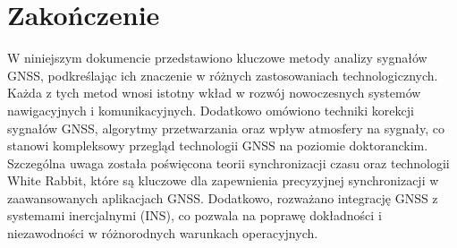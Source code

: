\section{Zakończenie}
W niniejszym dokumencie przedstawiono kluczowe metody analizy sygnałów GNSS, podkreślając ich znaczenie w różnych zastosowaniach technologicznych. Każda z tych metod wnosi istotny wkład w rozwój nowoczesnych systemów nawigacyjnych i komunikacyjnych. Dodatkowo omówiono techniki korekcji sygnałów GNSS, algorytmy przetwarzania oraz wpływ atmosfery na sygnały, co stanowi kompleksowy przegląd technologii GNSS na poziomie doktoranckim. Szczególna uwaga została poświęcona teorii synchronizacji czasu oraz technologii White Rabbit, które są kluczowe dla zapewnienia precyzyjnej synchronizacji w zaawansowanych aplikacjach GNSS. Dodatkowo, rozważano integrację GNSS z systemami inercjalnymi (INS), co pozwala na poprawę dokładności i niezawodności w różnorodnych warunkach operacyjnych.
